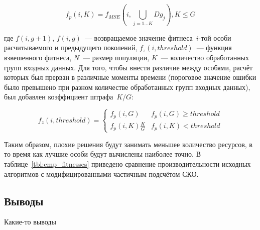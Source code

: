 \begin{equation}
\label{eq:zerg_partial_mse_fit_form_exp}
f_{p}(i, K) = f_{MSE}(i, \bigcup_{j=1\ldots K}{Dg_{j}}), K \le G
\end{equation}

где $f(i, g + 1)$, $f(i, g)$~--- возвращаемое значение фитнеса~$i$-той особи расчитываемого и предыдущего поколений, $f_{z}(i, threshold)$~--- функция взвешенного фитнеса, $N$~--- размер популяции, $K$~--- количество обработанных групп входных данных. Для того, чтобы внести различие между особями, расчёт которых был прерван в различные моменты времени (пороговое значение ошибки было превышено при разном количестве обработанных групп входных данных), был добавлен коэффициент штрафа~$K/G$:

\begin{equation}
\label{eq:zerg_partial_mse_fitness}
f_{z}(i, threshold) =
	\begin{cases}
		f_{p}(i, G) & f_{p}(i, G) \ge threshold \\
		f_{p}(i, K)\frac{K}{G} & f_{p}(i, K) < threshold
	\end{cases}
\end{equation}

Таким образом, плохие решения будут занимать меньшее количество ресурсов, в то время как лучшие особи будут вычислены наиболее точно. В таблице~\ref{tbl:cmp_fitnesses} приведено сравнение производительности исходных алгоритмов с модифицированными частичным подсчётом СКО.









\subsection{Выводы}

Какие-то выводы
